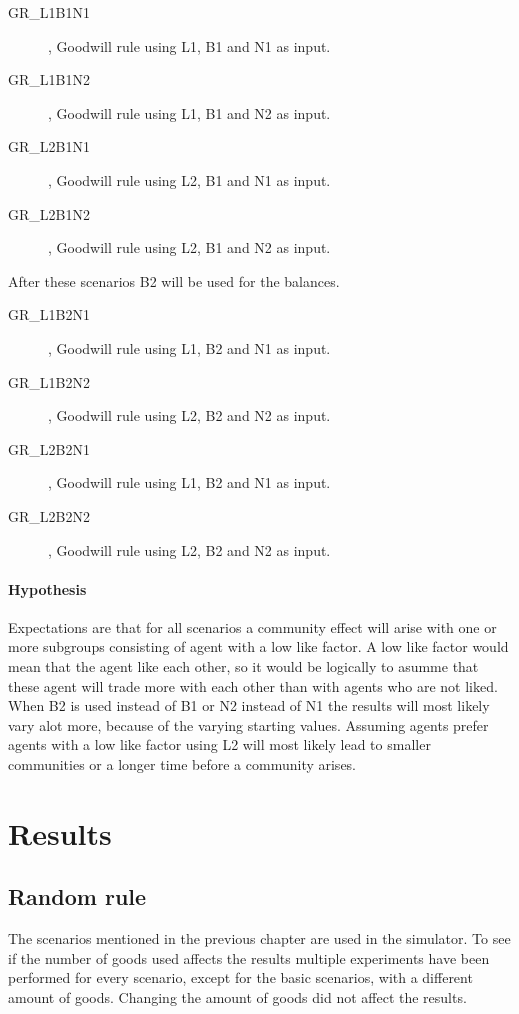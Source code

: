 \documentclass[twoside,openright]{uva-bachelor-thesis}
\begin{document}
\begin{description}
\item[GR\_L1B1N1], Goodwill rule using L1, B1 and N1 as input.
\item[GR\_L1B1N2], Goodwill rule using L1, B1 and N2 as input.
\item[GR\_L2B1N1], Goodwill rule using L2, B1 and N1 as input.
\item[GR\_L2B1N2], Goodwill rule using L2, B1 and N2 as input.
\end{description}
After these scenarios B2 will be used for the balances.
\begin{description}
\item[GR\_L1B2N1], Goodwill rule using L1, B2 and N1 as input.
\item[GR\_L1B2N2], Goodwill rule using L2, B2 and N2 as input.
\item[GR\_L2B2N1], Goodwill rule using L1, B2 and N1 as input.
\item[GR\_L2B2N2], Goodwill rule using L2, B2 and N2 as input.
\end{description}

\subsubsection{Hypothesis}
Expectations are that for all scenarios a community effect will arise with one or more subgroups consisting of agent with a low like factor. A low like factor would mean that the agent like each other, so it would be logically to asumme that these agent will trade more with each other than with agents who are not liked. When B2 is used instead of B1 or N2 instead of N1 the results will most likely vary alot more, because of the varying starting values. Assuming agents prefer agents with a low like factor using L2 will most likely lead to smaller communities or a longer time before a community arises.



\chapter{Results}

\section{Random rule}
The scenarios mentioned in the previous chapter are used in the simulator. To see if the number of goods used affects the results multiple experiments have been performed for every scenario, except for the basic scenarios, with a different amount of goods. Changing the amount of goods did not affect the results.
\end{document}
